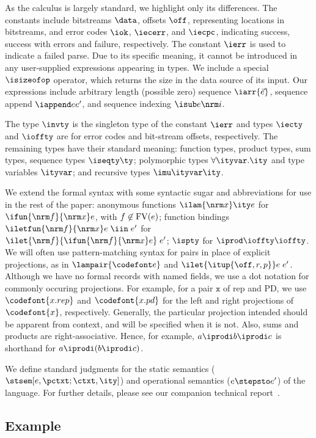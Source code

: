 As the calculus is largely standard, we highlight only its
differences. The constants include bitstreams $\data$, offsets $\off$,
representing locations in bitstreams, and error codes $\iok$,
$\iecerr$, and $\iecpc$, indicating success, success with errors and
failure, respectively. The constant $\ierr$ is used to indicate a
failed parse.  Due to its specific meaning, it cannot be introduced in
any user-supplied expressions appearing in \ddc{} types. We include a
special $\isizeofop$ operator, which returns the size in the data
source of its input. Our expressions include arbitrary length
(possible zero) sequence $\iarr{\vec e}$, sequence append $\iappend e
{e'}$, and sequence indexing $\isub e {\nrm i}$.

The type $\invty$ is the singleton type of the constant $\ierr$ and
types $\iecty$ and $\ioffty$ are for error codes and bit-stream
offsets, respectively. The remaining types have their standard
meaning: function types, product types, sum types, sequence types
$\iseqty \ty$; polymorphic types $\forall \ityvar.\ity$ and type
variables $\ityvar$; and recursive types $\imu \ityvar \ity$.

We extend the formal syntax with some syntactic sugar and
abbreviations for use in the rest of the paper: anonymous functions
$\ilam {\nrm x} \ity e$ for $\ifun {\nrm f} {\nrm x} e$, with $f
\not\in {\rm FV}(e)$; function bindings $\iletfun {\nrm f} {\nrm x} e
\; \iin \; e'$ for $\ilet {\nrm f} {\ifun {\nrm f} {\nrm x} e} \; e'$;
$\ispty$ for $\iprod \ioffty \ioffty$.  We will often use
pattern-matching syntax for pairs in place of explicit projections, as
in $\lampair{\codefont e}$ and $\ilet {\itup{\off,r,p}} e\; e'$.  Although
we have no formal records with named fields, we use a dot notation for
commonly occuring projections. For example, for a pair $\mathtt x$ of
rep and PD, we use $\codefont{x.rep}$ and $\codefont{x.pd}$ for the
left and right projections of $\codefont{x}$, respectively. Generally,
the particular projection intended should be apparent from context,
and will be specified when it is not. Also, sums and products are
right-associative. Hence, for example, $a \iprodi b \iprodi c$ is
shorthand for $a \iprodi (b \iprodi c)$.

We define standard judgments for the static semantics
($\stsem[e,{\pctxt;\ctxt},\ity]$) and operational semantics ($e
\stepsto e'$) of the \implang{} language. For further details, please
see our companion technical report~\cite{fisher+:pads-semantics-ext}.

\subsection{Example}
\label{sec:ddc-example}

